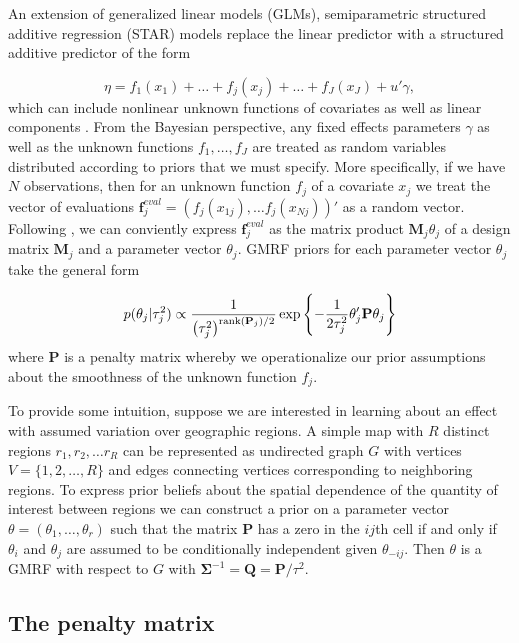 An extension of generalized linear models (GLMs), semiparametric structured additive regression (STAR) models replace the linear predictor with a structured additive predictor of the form

{\singlespacing
$$\eta = f_1(x_1) + \ldots + f_j(x_j) + \ldots + f_J(x_J) + u'\gamma, $$
}
%
\noindent which can include nonlinear unknown functions of covariates as well as linear components . From the Bayesian perspective, any fixed effects parameters $\gamma$ as well as the unknown functions $f_1, \dots, f_J$ are treated as random variables distributed according to priors that we must specify. More specifically, if we have $N$ observations, then for an unknown function $f_j$ of a covariate $x_j$ we treat the vector of evaluations $\mathbf{f}_j^{eval} = \left(f_j(x_{1j}), \dots f_j(x_{Nj})\right)' $ as a random vector. Following , we can conviently express $\mathbf{f}_j^{eval}$ as the matrix product $\mathbf{M}_j \theta_j$ of a design matrix $\mathbf{M}_j$ and a parameter vector $\theta_j$. GMRF priors for each parameter vector $\theta_j$ take the general form

{\singlespacing
$$
p(\theta_j | \tau^2_j) 
\propto 
\frac{1}{\left(\tau^2_j\right)^{{\rm rank}(\mathbf{P}_j)/2} }
\exp{\left\{-\frac{1}{2\tau^2_j} \theta_j' \mathbf{P} \theta_j\right\}}
$$ 
}
% 
\noindent where $\mathbf{P}$ is a penalty matrix whereby we operationalize our prior assumptions about the smoothness of the unknown function $f_j$. 

To provide some intuition, suppose we are interested in learning about an effect with assumed variation over geographic regions.  A simple map with $R$ distinct regions $r_1, r_2, \dots r_R$ can be represented as undirected graph $G$ with vertices $V = \{1, 2, \dots, R\}$ and edges connecting vertices corresponding to neighboring regions. To express prior beliefs about the spatial dependence of the quantity of interest between regions we can construct a prior on a parameter vector $\theta = (\theta_1, \dots, \theta_r)$ such that the matrix $\mathbf{P}$ has a zero in the $ij$th cell if and only if $\theta_i$ and $\theta_j$ are assumed to be conditionally independent given $\theta_{-ij}$. Then $\theta$ is a GMRF with respect to $G$ with $\boldsymbol{\Sigma}^{-1} = \mathbf{Q} = \mathbf{P}/\tau^2$. 

\subsection{The penalty matrix} 

